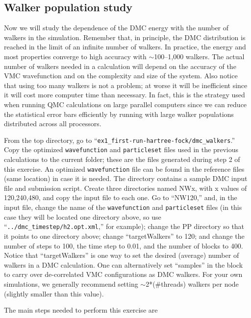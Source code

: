 \subsection{Walker population study}
Now we will study the dependence of the DMC energy with the number of walkers in the
simulation. Remember that, in principle, the DMC distribution is reached in the limit of
an infinite number of walkers. In practice, the energy and most properties converge to high
accuracy with $\sim$100--1,000 walkers. The actual number of walkers needed in a calculation
will depend on the accuracy of the VMC wavefunction and on the complexity and size of
the system. Also notice that using too many walkers is not a problem; at worse it will be
inefficient since it will cost more computer time than necessary. In fact, this is the strategy
used when running QMC calculations on large parallel computers since we can reduce the
statistical error bars efficiently by running with large walker populations distributed across
all processors.

From the top directory, go to ``\texttt{ex1\_first-run-hartree-fock/dmc\_walkers}.'' Copy the
optimized \texttt{wavefunction} and \texttt{particleset} files used in the previous calculations to the current
folder; these are the files generated during step 2 of this exercise. An optimized \texttt{wavefunction} file can be found in the reference files (same location) in case it is needed. The directory
contains a sample DMC input file and submission script. Create three  directories named NWx,
with x values of 120,240,480, and copy the input file to each one. Go
to ``NW120,'' and, in the input file, change the name of the \texttt{wavefunction} and \texttt{particleset}
files (in this case they will be located one directory above, so use ``\texttt{../dmc\_timestep/h2.opt.xml},'' for
example); change the PP directory so that it points to one directory above; change ``targetWalkers'' to 120; and change the number of steps to 100, the time step
to 0.01, and the number of blocks to 400. Notice that ``targetWalkers'' is one way to set the desired (average) number of walkers in a DMC calculation. One can alternatively set ``samples'' in the  block to carry over de-correlated VMC configurations as DMC walkers. For your own simulations, we generally recommend setting $\sim$2*(\#threads)
walkers per node (slightly smaller than this value).

The main steps needed to perform this exercise are


